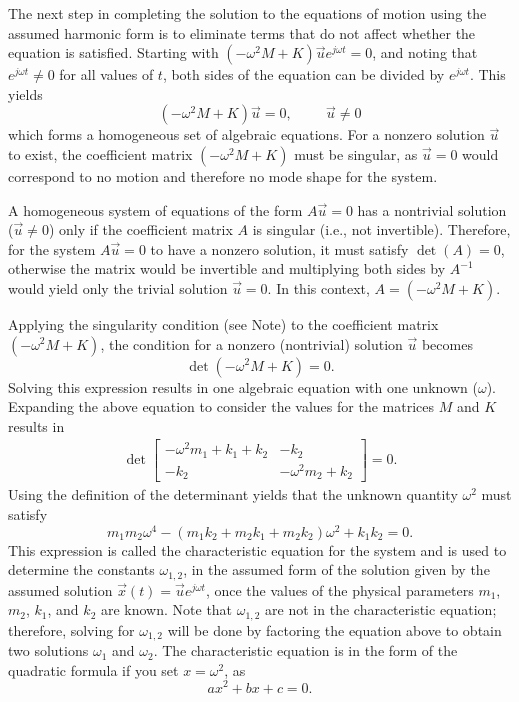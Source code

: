 \documentclass[12pt,letter]{article}
\begin{document}
The next step in completing the solution to the equations of motion using the assumed harmonic form is to eliminate terms that do not affect whether the equation is satisfied. Starting with $(-\omega^2 M + K)\vec{u}e^{j\omega t} = 0$, and noting that $e^{j\omega t} \neq 0$ for all values of $t$, both sides of the equation can be divided by $e^{j\omega t}$. This yields
\begin{equation}
	(-\omega^2 M + K)\vec{u} = 0, \hspace{1cm} \vec{u} \neq 0
\end{equation}
which forms a homogeneous set of algebraic equations. 
For a nonzero solution $\vec{u}$ to exist, the coefficient matrix $(-\omega^2 M + K)$ must be singular, as $\vec{u} = 0$ would correspond to no motion and therefore no mode shape for the system.

\begin{note}
	A homogeneous system of equations of the form $A\vec{u} = 0$ has a nontrivial solution ($\vec{u} \neq 0$) only if the coefficient matrix $A$ is singular (i.e., not invertible). Therefore, for the system $A\vec{u} = 0$ to have a nonzero solution, it must satisfy $\det(A) = 0$, otherwise the matrix would be invertible and multiplying both sides by $A^{-1}$ would yield only the trivial solution $\vec{u} = 0$. In this context, $A = (-\omega^2 M + K)$.
\end{note}

Applying the singularity condition (see Note) to the coefficient matrix $(-\omega^2 M + K)$, the condition for a nonzero (nontrivial) solution $\vec{u}$ becomes
\begin{equation}
\det(-\omega^2 M  + K) = 0.
\end{equation}
Solving this expression results in one algebraic equation with one unknown ($\omega$). Expanding the above equation to consider the values for the matrices $M$ and $K$ results in
\begin{eqnarray}
\det\begin{bmatrix} -\omega^2 m_1 + k_1 + k_2 & -k_2  \\  -k_2 & -\omega^2 m_2 + k_2 \end{bmatrix}=0.
\end{eqnarray}
Using the definition of the determinant yields that the unknown quantity $\omega^2$ must satisfy
\begin{equation}
m_1 m_2 \omega^4 - (m_1 k_2 + m_2 k_1 + m_2 k_2)\omega^2 + k_1 k_2 = 0.
\label{eq:characteristic_equation}
\end{equation}
This expression is called the characteristic equation for the system and is used to determine the constants $\omega_{1,2}$, in the assumed form of the solution given by the assumed solution $\vec{x}(t) = \vec{u}e^{j\omega t}$, once the values of the physical parameters $m_1$, $m_2$, $k_1$, and $k_2$ are known. Note that $\omega_{1,2}$ are not in the characteristic equation; therefore, solving for $\omega_{1,2}$  will be done by factoring the equation above to obtain two solutions $\omega_1$ and $\omega_2$. The characteristic equation is in the form of the quadratic formula if you set $x=\omega^2$, as
\begin{equation}
ax^2 + bx +c = 0.
\end{equation}
\end{document}

